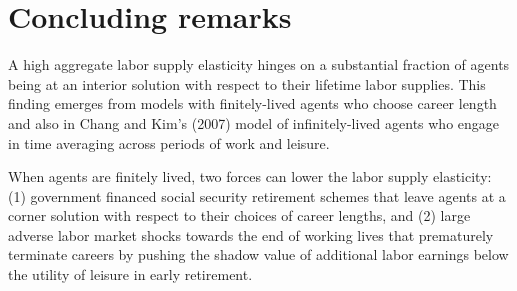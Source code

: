 



\section{Concluding remarks}

A high aggregate labor supply elasticity hinges on a substantial
fraction of agents being at an interior solution with respect to their lifetime labor supplies.
This finding emerges  from models with
finitely-lived agents who choose career length and also
in Chang and Kim's (2007) model of infinitely-lived agents
who engage in time averaging across periods of work and leisure.

 When agents are finitely lived, two forces  can lower the labor supply
elasticity: (1) government financed
social security retirement schemes that leave agents at a corner
solution with respect to their choices of career lengths,  and (2)  large adverse
labor market shocks towards the end of working lives that
prematurely terminate careers by pushing  the shadow value of additional labor earnings  below the utility
of leisure in early retirement.


